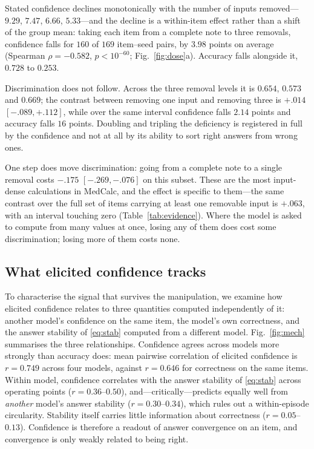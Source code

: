 \documentclass[journal,twoside]{IEEEtran}
\begin{document}
Stated confidence declines monotonically with the number of inputs removed---$9.29$, $7.47$, $6.66$,
$5.33$---and the decline is a within-item effect rather than a shift of the group mean: taking each
item from a complete note to three removals, confidence falls for $160$ of $169$ item--seed pairs, by
$3.98$ points on average (Spearman $\rho = -0.582$, $p < 10^{-60}$; Fig.~\ref{fig:dose}a). Accuracy
falls alongside it, $0.728$ to $0.253$.

Discrimination does not follow. Across the three removal levels it is $0.654$, $0.573$ and $0.669$;
the contrast between removing one input and removing three is $+.014$ $[-.089,+.112]$, while over the
same interval confidence falls $2.14$ points and accuracy falls $16$ points. Doubling and tripling
the deficiency is registered in full by the confidence and not at all by its ability to sort right
answers from wrong ones.

One step does move discrimination: going from a complete note to a single removal costs
$-.175$ $[-.269,-.076]$ on this subset. These are the most input-dense calculations in MedCalc, and
the effect is specific to them---the same contrast over the full set of items carrying at least one
removable input is $+.063$, with an interval touching zero (Table~\ref{tab:evidence}). Where the
model is asked to compute from many values at once, losing any of them does cost some discrimination;
losing more of them costs none.

\subsection{What elicited confidence tracks}
To characterise the signal that survives the manipulation, we examine how elicited confidence relates
to three quantities computed independently of it: another model's confidence on the same item, the
model's own correctness, and the answer stability of \eqref{eq:stab} computed from a different
model. Fig.~\ref{fig:mech} summarises the three relationships. Confidence agrees across models more
strongly than accuracy does: mean pairwise correlation of
elicited confidence is $r=0.749$ across four models, against $r=0.646$ for correctness on the same
items. Within model, confidence correlates with the answer stability of \eqref{eq:stab} across
operating points ($r=0.36$--$0.50$), and---critically---predicts equally well from \emph{another}
model's answer stability ($r=0.30$--$0.34$), which rules out a within-episode circularity. Stability
itself carries little information about correctness ($r=0.05$--$0.13$). Confidence is therefore a
readout of answer convergence on an item, and convergence is only weakly related to being right.
\end{document}
